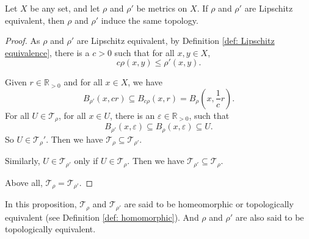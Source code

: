 \begin{proposition}
	\label{prop: Lipschitz equivalent metrics induces the same topology}
	Let $X$ be any set, and let $\rho$ and $\rho'$ be metrics on $X$. If $\rho$ and $\rho'$ are Lipschitz equivalent, then $\rho$ and $\rho'$ induce the same topology.
	
	\begin{proof}
		As $\rho$ and $\rho'$ are Lipschitz equivalent, by Definition \ref{def: Lipschitz equivalence}, there is a $c > 0$ such that for all $x,y \in X$,
		$$
		c \rho(x,y) \le \rho'(x,y).
		$$
		
		Given $r \in \mathbb R_{> 0}$ and for all $x \in X$, we have
		$$
		B_{\rho'}(x, cr) \subseteq B_{c \rho}(x, r) = B_\rho \left( x, \frac{1}{c} r \right).
		$$
		For all $U \in \mathcal T_\rho$, for all $x \in U$, there is an $\varepsilon \in \mathbb R_{> 0}$, such that
		$$
		B_{\rho'} (x, \varepsilon) \subseteq B_{\rho}(x, \varepsilon) \subseteq U.
		$$
		So $U \in \mathcal T_\rho'$. Then we have $\mathcal T_{\rho} \subseteq \mathcal T_{\rho'}$.
		
		Similarly, $U \in \mathcal T_{\rho'}$ only if $U \in \mathcal T_\rho$. Then we have $\mathcal T_{\rho'} \subseteq \mathcal T_{\rho}$.
		
		Above all, $\mathcal T_{\rho} = \mathcal T_{\rho'}$.
	\end{proof}
\end{proposition}


\begin{note}
	In this proposition, $\mathcal T_\rho$ and $\mathcal T_{\rho'}$ are said to be homeomorphic or topologically equivalent (see Definition \ref{def: homomorphic}). And $\rho$ and $\rho'$ are also said to be topologically equivalent.
\end{note}


